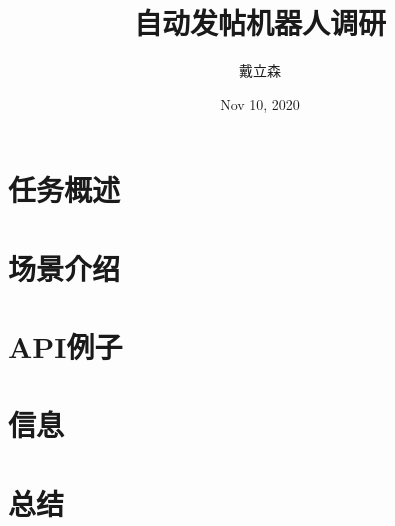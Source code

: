 \documentclass[10pt]{beamer}
\title{
    {自动发帖机器人调研}
}
\author{戴立森}
\date{Nov 10, 2020}
\begin{document}
    \maketitle
    \section*{任务概述}
    
    \section*{场景介绍}
    
    \section*{API例子}
    
    \section*{信息}
    
    \section*{总结}
    

        
\end{document}

